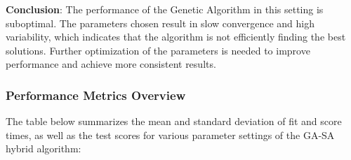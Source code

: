 \documentclass{article}
\begin{document}
    \textbf{Conclusion}: The performance of the Genetic Algorithm in this setting is suboptimal. The parameters chosen result in slow convergence and high variability, which indicates that the algorithm is not efficiently finding the best solutions. Further optimization of the parameters is needed to improve performance and achieve more consistent results.

    \subsubsection{Performance Metrics Overview}

    The table below summarizes the mean and standard deviation of fit and score times, as well as the test scores for various parameter settings of the GA-SA hybrid algorithm:
\end{document}
